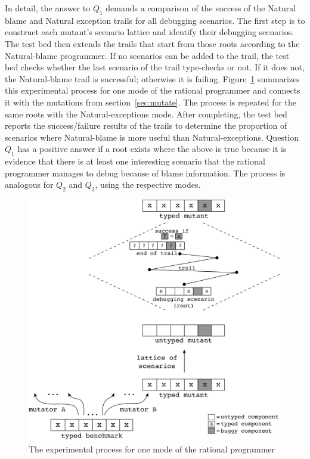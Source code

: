 
In detail, the answer to $Q_1$ demands a comparison of the success of the Natural
blame and Natural exception trails for all debugging scenarios.  The
first step is to construct each mutant's scenario lattice and identify their
debugging scenarios.  The test bed then extends the trails that start
from those roots according to the Natural-blame programmer.  If no scenarios can
be added to the trail, the test bed checks whether the last scenario
of the trail type-checks or not. If it does not, the
Natural-blame trail is successful; otherwise it is failing. 
Figure~\ref{fig:process} summarizes this experimental process for
one mode of the rational programmer and connects it with the mutations from
section~\ref{sec:mutate}.
The process is repeated for the same roots with the Natural-exceptions mode.
After completing, the test bed
reports the success/failure results of the trails to determine the proportion of
scenarios where Natural-blame is more useful than Natural-exceptions.  Question
$Q_1$ has a positive answer if a root exists where the above is true because it
is evidence that there is at least one interesting scenario that the rational
programmer manages to debug because of blame information.  The process is analogous
for $Q_2$ and $Q_3$, using the respective modes. %

\begin{figure}[bh] \footnotesize
  \centering
  \includegraphics[scale=0.36]{./Images/process}
  \caption{The experimental process for one mode of the rational programmer}
  \label{fig:process}
\end{figure}



